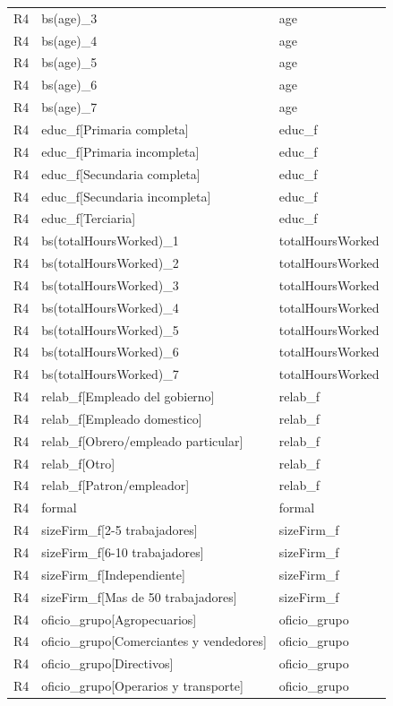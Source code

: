 \begin{longtable}{lll}
R4 & bs(age)\_3 & age \\
R4 & bs(age)\_4 & age \\
R4 & bs(age)\_5 & age \\
R4 & bs(age)\_6 & age \\
R4 & bs(age)\_7 & age \\
R4 & educ\_f[Primaria completa] & educ\_f \\
R4 & educ\_f[Primaria incompleta] & educ\_f \\
R4 & educ\_f[Secundaria completa] & educ\_f \\
R4 & educ\_f[Secundaria incompleta] & educ\_f \\
R4 & educ\_f[Terciaria] & educ\_f \\
R4 & bs(totalHoursWorked)\_1 & totalHoursWorked \\
R4 & bs(totalHoursWorked)\_2 & totalHoursWorked \\
R4 & bs(totalHoursWorked)\_3 & totalHoursWorked \\
R4 & bs(totalHoursWorked)\_4 & totalHoursWorked \\
R4 & bs(totalHoursWorked)\_5 & totalHoursWorked \\
R4 & bs(totalHoursWorked)\_6 & totalHoursWorked \\
R4 & bs(totalHoursWorked)\_7 & totalHoursWorked \\
R4 & relab\_f[Empleado del gobierno] & relab\_f \\
R4 & relab\_f[Empleado domestico] & relab\_f \\
R4 & relab\_f[Obrero/empleado particular] & relab\_f \\
R4 & relab\_f[Otro] & relab\_f \\
R4 & relab\_f[Patron/empleador] & relab\_f \\
R4 & formal & formal \\
R4 & sizeFirm\_f[2-5 trabajadores] & sizeFirm\_f \\
R4 & sizeFirm\_f[6-10 trabajadores] & sizeFirm\_f \\
R4 & sizeFirm\_f[Independiente] & sizeFirm\_f \\
R4 & sizeFirm\_f[Mas de 50 trabajadores] & sizeFirm\_f \\
R4 & oficio\_grupo[Agropecuarios] & oficio\_grupo \\
R4 & oficio\_grupo[Comerciantes y vendedores] & oficio\_grupo \\
R4 & oficio\_grupo[Directivos] & oficio\_grupo \\
R4 & oficio\_grupo[Operarios y transporte] & oficio\_grupo \\

\end{longtable}
